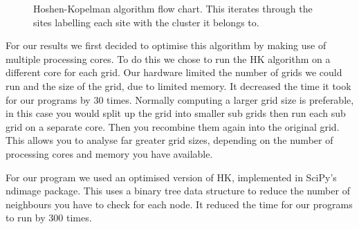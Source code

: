 \documentclass[%
 reprint,
 amsmath,amssymb,
 aps,
]{revtex4-2}
\begin{document}
\begin{figure}
    \centering
    \caption{Hoshen-Kopelman algorithm flow chart. This iterates through the sites labelling each site with the cluster it belongs to. }
    \label{fig:hk_flow}
\end{figure}

For our results we first decided to optimise this algorithm by making use of multiple processing cores. To do this we chose to run the HK algorithm on a different core for each grid. Our hardware limited the number of grids we could run and the size of the grid, due to limited memory. It decreased the time it took for our programs by $30$ times. Normally computing a larger grid size is preferable, in this case you would split up the grid into smaller sub grids then run each sub grid on a separate core. Then you recombine them again into the original grid. This allows you to analyse far greater grid sizes, depending on the number of processing cores and memory you have available.

For our program we used an optimised version of HK, implemented in SciPy's ndimage package\cite{scipy_community_multidimensional_nodate}. This uses a binary tree data structure to reduce the number of neighbours you have to check for each node. It reduced the time for our programs to run by 300 times.
\cite{wu_optimizing_2005}
\end{document}
